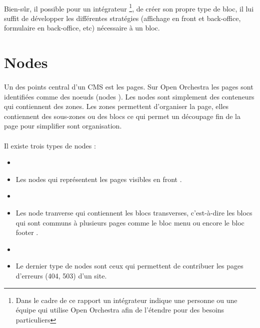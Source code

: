 	      \paragraph{}
	      	 Bien-sûr, il possible pour un intégrateur \footnote{Dans le cadre de ce rapport un intégrateur indique une personne ou une équipe qui utilise Open Orchestra afin de  l'étendre pour des besoins particuliers}, de créer son propre type de bloc, il lui suffit de développer les différentes stratégies (affichage en front et back-office, formulaire en back-office, etc) nécessaire à un bloc.  
         \section{Nodes}
         \paragraph{}
         Un des points central d'un CMS est les pages. Sur Open Orchestra les pages sont identifiées comme des noeuds (\og nodes \fg{}).
          Les nodes sont simplement des conteneurs qui contiennent des zones. Les zones permettent d'organiser la page, elles contiennent des sous-zones ou des blocs ce qui permet un découpage fin de la page pour simplifier sont organisation. 
         \paragraph{}
         Il existe trois types de nodes : 
         \begin{itemize}
         \item[]
         \item  Les nodes qui représentent les pages visibles en \og front \fg{}.
          \item[]
         \item  Les \og node tranverse \fg{} qui contiennent les blocs transverses, c'est-à-dire les blocs qui sont communs à plusieurs pages comme le bloc \og menu \fg{} ou encore le bloc \og footer \fg{}.
          \item[]
         \item Le dernier type de nodes sont ceux qui permettent de contribuer les pages d'erreurs (404, 503) d'un site.
         \end{itemize}
